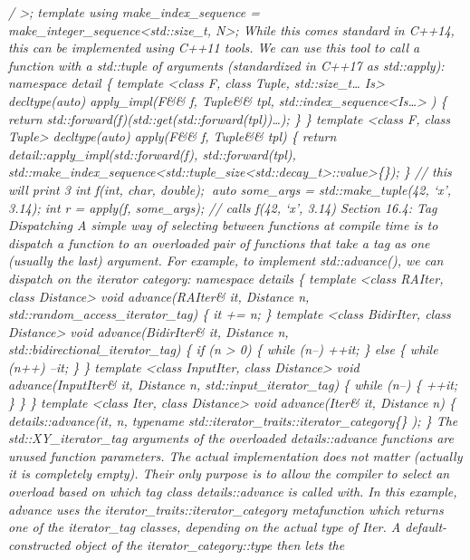 \emph{/ \textgreater; template using make\_index\_sequence =
make\_integer\_sequence\textless std::size\_t, N\textgreater; While this
comes standard in C++14, this can be implemented using C++11 tools. We
can use this tool to call a function with a std::tuple of arguments
(standardized in C++17 as std::apply): namespace detail \{ template
\textless class F, class Tuple, std::size\_t\ldots{} Is\textgreater{}
decltype(auto) apply\_impl(F\&\& f, Tuple\&\& tpl,
std::index\_sequence\textless Is\ldots\textgreater{} ) \{ return
std::forward(f)(std::get(std::forward(tpl))\ldots); \} \} template
\textless class F, class Tuple\textgreater{} decltype(auto) apply(F\&\&
f, Tuple\&\& tpl) \{ return detail::apply\_impl(std::forward(f),
std::forward(tpl),
std::make\_index\_sequence\textless std::tuple\_size\textless std::decay\_t\textgreater::value\textgreater\{\});
\} // this will print 3 int f(int, char, double); auto some\_args =
std::make\_tuple(42, `x', 3.14); int r = apply(f, some\_args); // calls
f(42, `x', 3.14) Section 16.4: Tag Dispatching A simple way of selecting
between functions at compile time is to dispatch a function to an
overloaded pair of functions that take a tag as one (usually the last)
argument. For example, to implement std::advance(), we can dispatch on
the iterator category: namespace details \{ template \textless class
RAIter, class Distance\textgreater{} void advance(RAIter\& it, Distance
n, std::random\_access\_iterator\_tag) \{ it += n; \} template
\textless class BidirIter, class Distance\textgreater{} void
advance(BidirIter\& it, Distance n, std::bidirectional\_iterator\_tag)
\{ if (n \textgreater{} 0) \{ while (n--) ++it; \} else \{ while (n++)
--it; \} \} template \textless class InputIter, class
Distance\textgreater{} void advance(InputIter\& it, Distance n,
std::input\_iterator\_tag) \{ while (n--) \{ ++it; \} \} \} template
\textless class Iter, class Distance\textgreater{} void advance(Iter\&
it, Distance n) \{ details::advance(it, n, typename
std::iterator\_traits::iterator\_category\{\} ); \} The
std::XY\_iterator\_tag arguments of the overloaded details::advance
functions are unused function parameters. The actual implementation does
not matter (actually it is completely empty). Their only purpose is to
allow the compiler to select an overload based on which tag class
details::advance is called with. In this example, advance uses the
iterator\_traits::iterator\_category metafunction which returns one of
the iterator\_tag classes, depending on the actual type of Iter. A
default-constructed object of the iterator\_category::type then lets the
}
